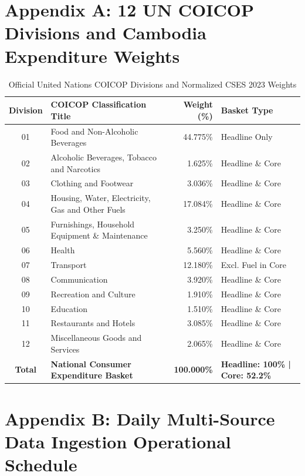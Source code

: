 \section*{Appendix A: 12 UN COICOP Divisions and Cambodia Expenditure Weights}

\begin{table}[H]
\centering
\small
\setlength{\tabcolsep}{4pt}
\begin{tabularx}{\textwidth}{|c|>{\raggedright\arraybackslash}X|r|>{\raggedright\arraybackslash}p{3.8cm}|}
\hline
\rowcolor{blue!20}
\textbf{Division} & \textbf{COICOP Classification Title} & \textbf{Weight (\%)} & \textbf{Basket Type} \\ \hline
01 & Food and Non-Alcoholic Beverages & 44.775\% & Headline Only \\ \hline
02 & Alcoholic Beverages, Tobacco and Narcotics & 1.625\% & Headline \& Core \\ \hline
03 & Clothing and Footwear & 3.036\% & Headline \& Core \\ \hline
04 & Housing, Water, Electricity, Gas and Other Fuels & 17.084\% & Headline \& Core \\ \hline
05 & Furnishings, Household Equipment \& Maintenance & 3.250\% & Headline \& Core \\ \hline
06 & Health & 5.560\% & Headline \& Core \\ \hline
07 & Transport & 12.180\% & Excl. Fuel in Core \\ \hline
08 & Communication & 3.920\% & Headline \& Core \\ \hline
09 & Recreation and Culture & 1.910\% & Headline \& Core \\ \hline
10 & Education & 1.510\% & Headline \& Core \\ \hline
11 & Restaurants and Hotels & 3.085\% & Headline \& Core \\ \hline
12 & Miscellaneous Goods and Services & 2.065\% & Headline \& Core \\ \hline
\textbf{Total} & \textbf{National Consumer Expenditure Basket} & \textbf{100.000\%} & \textbf{Headline: 100\% | Core: 52.2\%} \\ \hline
\end{tabularx}
\caption{Official United Nations COICOP Divisions and Normalized CSES 2023 Weights}
\label{tab:appendix_coicop_weights}
\end{table}

\section*{Appendix B: Daily Multi-Source Data Ingestion Operational Schedule}

